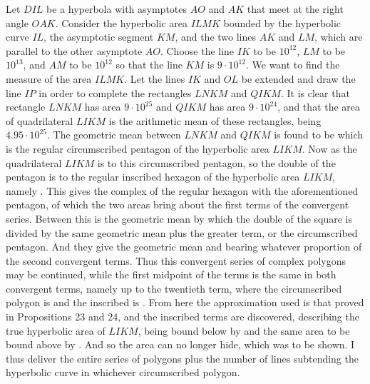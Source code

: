 \documentclass[11pt,letterpaper]{book}
\begin{document}
Let $DIL$ be a hyperbola with asymptotes $AO$ and $AK$ that meet at the right
angle $OAK$. Consider the hyperbolic area $ILMK$ bounded by the hyperbolic
curve $IL$, the asymptotic segment $KM$, and the two lines $AK$ and $LM$, which
are parallel to the other asymptote $AO$. Choose the line $IK$ to be $10^{12}$,
$LM$ to be $10^{13}$, and $AM$ to be $10^{12}$ so that the line $KM$ is
$9\cdot 10^{12}$. We want to find the measure of the area $ILMK$. Let the lines
$IK$ and $OL$ be extended and draw the line $IP$ in order to complete the
rectangles $LNKM$ and $QIKM$. It is clear that rectangle $LNKM$ has area
$9\cdot 10^{25}$ and $QIKM$ has area $9\cdot 10^{24}$, and that the area of
quadrilateral $LIKM$ is the arithmetic mean of these rectangles, being
$4.95\cdot 10^{25}$. The geometric mean between $LNKM$ and $QIKM$ is found to
be  which is the regular circumscribed
pentagon of the hyperbolic area $LIKM$. Now as the quadrilateral $LIKM$ is to this
circumscribed pentagon, so the double of the pentagon is to the regular
inscribed hexagon of the hyperbolic area $LIKM$, namely
. This gives the complex of the regular
hexagon with the aforementioned pentagon, of which the two areas bring about the
first terms of the convergent series. Between this is the geometric mean by
which the double of the square is divided by the same geometric mean plus the greater
term, or the circumscribed pentagon. And they give the geometric mean and bearing
whatever proportion of the second convergent terms. Thus this convergent series
of complex polygons may be continued, while the first midpoint of the terms is the
same in both convergent terms, namely up to the twentieth term, where the
circumscribed polygon is  and the
inscribed is . From here the approximation
used is that proved in Propositions 23 and 24, and the inscribed terms are
discovered, describing the true hyperbolic area of $LIKM$, being bound below by
 and the same area to be bound above by
. And so the area can no longer hide, which
was to be shown. I thus deliver the entire series of polygons plus the number of
lines subtending the hyperbolic curve in whichever circumscribed polygon.
\end{document}
